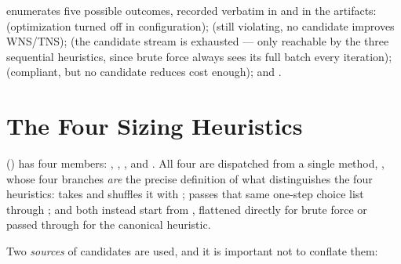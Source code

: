  enumerates five possible outcomes, recorded
verbatim in  and in the
 artifacts:  (optimization turned
off in configuration);  (still violating, no
candidate improves WNS/TNS);  (the candidate
stream is exhausted --- only reachable by the three sequential heuristics,
since brute force always sees its full batch every iteration);
 (compliant, but no candidate
reduces cost enough); and .

\section{The Four Sizing Heuristics}
\label{sec:opt-heuristics}

 () has four
members: , ,
, and . All four are
dispatched from a single method,
, whose four branches \emph{are} the precise
definition of what distinguishes the four heuristics: 
takes  and shuffles it
with ;  passes that
same one-step choice list through
;  and
 both instead start from
, flattened directly for
brute force or passed through 
for the canonical heuristic.

Two \emph{sources} of candidates are used, and it is important not to
conflate them:

